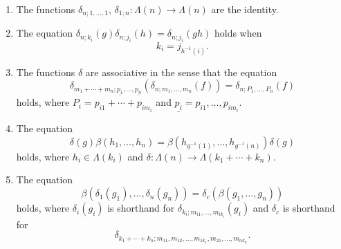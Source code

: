 \begin{thm}
\begin{enumerate}
\item\label{eq5} The functions $\delta_{n; 1, \ldots, 1}, \, \delta_{1;n} \colon \Lambda(n) \rightarrow \Lambda(n)$ are the identity.
\item\label{eq6} The equation $\delta_{n; k_{i}}(g) \delta_{n; j_{i}}(h) = \delta_{n; j_{i}}(gh)$ holds when
  \[
    k_{i} = j_{h^{-1}(i)}.
  \]
\item\label{eq7} The functions $\delta$ are associative in the sense that the equation
  \[
    \delta_{m_1 + \cdots + m_n; \underline{p_1},\ldots,\underline{p_n}}\left( \delta_{n; m_{1}, \ldots, m_{n}}(f) \right) = \delta_{n; P_{1}, \ldots, P_{n}}(f)
  \]
holds, where $P_{i} = p_{i1} + \cdots + p_{im_{i}}$ and $\underline{p_i} = p_{i1}, \ldots, p_{im_i}$.
\item\label{eq8} The equation
  \[
    \delta(g) \beta(h_{1}, \ldots, h_{n}) = \beta(h_{g^{-1}(1)}, \ldots,  h_{g^{-1}(n)}) \delta(g)
  \]
holds, where $h_{i} \in \Lambda(k_{i})$ and $\delta \colon \Lambda(n) \rightarrow \Lambda(k_{1} + \cdots + k_{n})$.
\item\label{eq9} The equation
  \[
    \beta(\delta_{1}(g_{1}), \ldots, \delta_{n}(g_{n})) = \delta_{c}(\beta(g_{1}, \ldots, g_{n}))
  \]
holds, where $\delta_{i}(g_{i})$ is shorthand for $\delta_{k_{i}; m_{i1}, \ldots, m_{ik_{i}}}(g_{i})$ and $\delta_{c}$ is shorthand for
  \[
    \delta_{k_{1}+\cdots + k_{n}; m_{11}, m_{12}, \ldots, m_{1k_{1}}, m_{21}, \ldots, m_{nk_{n}}}.
  \]
\end{enumerate}
\end{thm}

